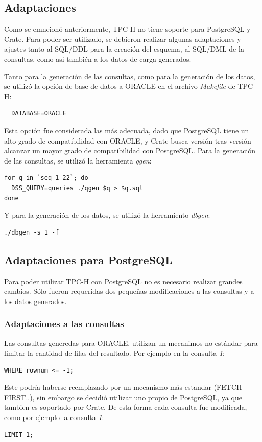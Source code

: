 \documentclass[11pt, twocolumns]{article}
\begin{document}
\begin{multicols}{2}
\section{Adaptaciones}
Como se emncionó anteriormente, TPC-H no tiene soporte para PostgreSQL y Crate. Para poder ser utilizado, se debieron realizar algunas adaptaciones y ajustes tanto al SQL/DDL para la creación del esquema, al SQL/DML de la consultas, como asi también a los datos de carga generados.
\par
Tanto para la generación de las consultas, como para la generación de los datos, se utilizó la opción de base de datos a ORACLE en el archivo \textit{Makefile} de TPC-H:
\begin{verbatim}
  DATABASE=ORACLE
\end{verbatim}
Esta opción fue considerada las más adecuada, dado que PostgreSQL tiene un alto grado de compatibilidad con ORACLE, y Crate busca versión tras versión alcanzar un mayor grado de compatibilidad con PostgreSQL.
Para la generación de las consultas, se utilizó la herramienta \textit{qgen}:
\begin{verbatim}
for q in `seq 1 22`; do
  DSS_QUERY=queries ./qgen $q > $q.sql
done
\end{verbatim}
Y para la generación de los datos, se utilizó la herramiento \textit{dbgen}:
\begin{verbatim}
./dbgen -s 1 -f  
\end{verbatim}

\subsection{Adaptaciones para PostgreSQL}
Para poder utilizar TPC-H con PostgreSQL no es necesario realizar grandes cambios. Sólo fueron requeridas dos pequeñas modificaciones a las consultas y a los datos generados.

\subsubsection{Adaptaciones a las consultas}
Las consultas generedas para ORACLE, utilizan un mecanimos no estándar para limitar la cantidad de filas del resultado. Por ejemplo en la consulta \textit{1}:
\begin{verbatim}
WHERE rownum <= -1;
\end{verbatim}
Este podría haberse reemplazado por un mecanismo más estandar (FETCH FIRST..), sin embargo se decidió utilizar uno propio de PostgreSQL, ya que tambien es soportado por Crate. De esta forma cada consulta fue modificada, como por ejemplo la consulta \textit{1}:
\begin{verbatim}
LIMIT 1;
\end{verbatim}


\end{multicols}
\end{document}
